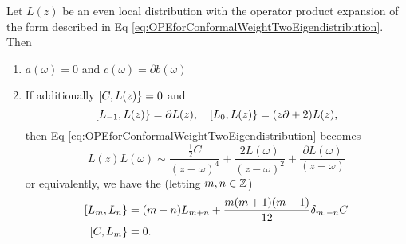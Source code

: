 \begin{thm}
Let $L(z)$ be an even local distribution with the operator product expansion of
the form described in Eq \eqref{eq:OPEforConformalWeightTwoEigendistribution}.
Then
\begin{enumerate}
\item $a(\omega)=0$ and $c(\omega)=\partial b(\omega)$
\item If additionally $[C,L(z)\}=0$ and 
\begin{equation}\label{eq:thm:hypothesis:superCommutator:OPEforWtTwo}
[L_{-1},L(z)\}=\partial L(z),\quad
[L_{0},L(z)\}=(z\partial+2)L(z),
\end{equation}
then Eq \eqref{eq:OPEforConformalWeightTwoEigendistribution} becomes
\begin{equation}
L(z)L(\omega)
\sim\frac{\frac{1}{2}C}{(z-\omega)^{4}}+\frac{2L(\omega)}{(z-\omega)^{2}}+\frac{\partial L(\omega)}{(z-\omega)}
\end{equation}
or equivalently, we have the  (letting $m,n\in\mathbb{Z}$)
\begin{equation}
\begin{split}
\superb{L_{m}}{L_{n}}&=(m-n)L_{m+n}+\frac{m(m+1)(m-1)}{12}\delta_{m,-n}C\\
\superb{C}{L_{m}}&=0.
\end{split}
\end{equation}
\end{enumerate}
\end{thm}
